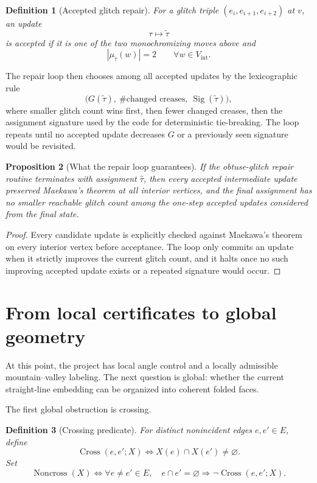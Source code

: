 \documentclass[11pt]{article}
\newtheorem{definition}{Definition}[section]
\newtheorem{proposition}[definition]{Proposition}
\theoremstyle{remark}
\newcommand{\abs}[1]{\left\lvert #1 \right\rvert}
\begin{document}
\begin{definition}[Accepted glitch repair]
For a glitch triple $(e_i,e_{i+1},e_{i+2})$ at $v$, an update
\[
\tau\mapsto\widetilde\tau
\]
is \emph{accepted} if it is one of the two monochromizing moves above and
\[
\abs{\mu_{\widetilde\tau}(w)}=2
\qquad
\forall w\in V_{\mathrm{int}}.
\]
\end{definition}

The repair loop then chooses among all accepted updates by the lexicographic
rule
\[
\bigl(G(\widetilde\tau),\ \#\text{changed creases},\ \operatorname{Sig}(\widetilde\tau)\bigr),
\]
where smaller glitch count wins first, then fewer changed creases, then the
assignment signature used by the code for deterministic tie-breaking. The loop
repeats until no accepted update decreases $G$ or a previously seen signature
would be revisited.

\begin{proposition}[What the repair loop guarantees]
If the obtuse-glitch repair routine terminates with assignment $\widehat\tau$,
then every accepted intermediate update preserved
Maekawa's theorem at all interior vertices, and the final assignment has no
smaller reachable glitch count among the one-step accepted updates considered
from the final state.
\end{proposition}

\begin{proof}
Every candidate update is explicitly checked against Maekawa's theorem on every
interior vertex before acceptance. The loop only commits an update when it
strictly improves the current glitch count, and it halts once no such improving
accepted update exists or a repeated signature would occur.
\end{proof}

\section{From local certificates to global geometry}

At this point, the project has local angle control and a locally admissible
mountain--valley labeling. The next question is global: whether the current
straight-line embedding can be organized into coherent folded faces.

The first global obstruction is crossing.

\begin{definition}[Crossing predicate]
For distinct nonincident edges $e,e'\in E$, define
\[
\operatorname{Cross}(e,e';X)
\Longleftrightarrow
X(e)\cap X(e')\ne\varnothing.
\]
Set
\[
\operatorname{Noncross}(X)
\Longleftrightarrow
\forall e\ne e' \in E,\quad
e\cap e'=\varnothing
\Longrightarrow
\neg \operatorname{Cross}(e,e';X).
\]
\end{definition}
\end{document}
